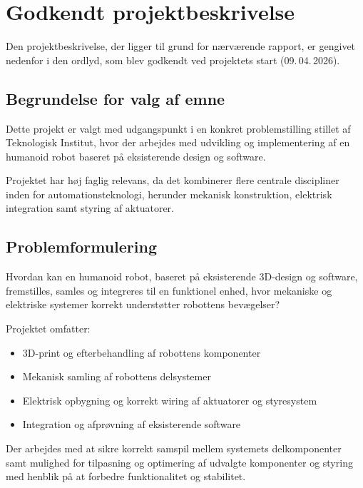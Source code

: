 
\chapter{Godkendt projektbeskrivelse}
\label{AppendixA}

Den projektbeskrivelse, der ligger til grund for nærværende
rapport, er gengivet nedenfor i den ordlyd, som blev godkendt ved
projektets start (09.\,04.\,2026).

\section*{Begrundelse for valg af emne}

Dette projekt er valgt med udgangspunkt i en konkret problemstilling
stillet af Teknologisk Institut, hvor der arbejdes med udvikling og
implementering af en humanoid robot baseret på eksisterende design
og software.

Projektet har høj faglig relevans, da det kombinerer flere centrale
discipliner inden for automationsteknologi, herunder mekanisk
konstruktion, elektrisk integration samt styring af aktuatorer.

\section*{Problemformulering}

Hvordan kan en humanoid robot, baseret på eksisterende 3D-design og
software, fremstilles, samles og integreres til en funktionel enhed,
hvor mekaniske og elektriske systemer korrekt understøtter robottens
bevægelser?

Projektet omfatter:

\begin{itemize}
    \item 3D-print og efterbehandling af robottens komponenter
    \item Mekanisk samling af robottens delsystemer
    \item Elektrisk opbygning og korrekt wiring af aktuatorer og
          styresystem
    \item Integration og afprøvning af eksisterende software
\end{itemize}

Der arbejdes med at sikre korrekt samspil mellem systemets
delkomponenter samt mulighed for tilpasning og optimering af
udvalgte komponenter og styring med henblik på at forbedre
funktionalitet og stabilitet.

